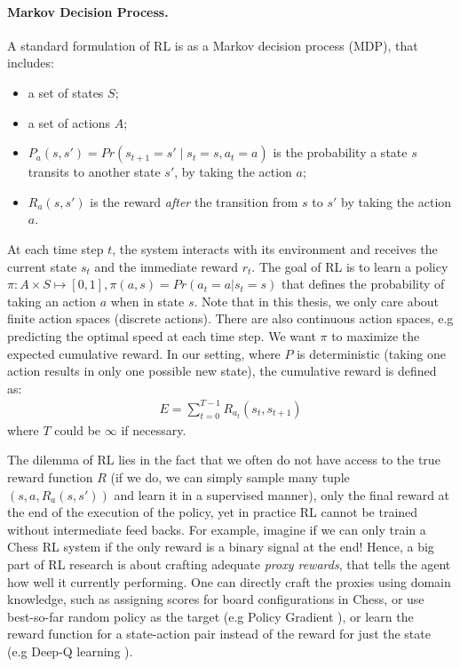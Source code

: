 \paragraph{Markov Decision Process.} A standard formulation of RL is as a
Markov decision process (MDP), that includes:
\begin{itemize}
  \item a set of states $S$;
  \item a set of actions $A$;
  \item $P_a(s, s') = Pr(s_{t+1} = s' \mid s_t = s, a_t = a)$ is the probability
    a state $s$ transits to another state $s'$, by taking the action $a$;
  \item $R_a(s, s')$ is the reward \emph{after} the transition from $s$ to $s'$ by
    taking the action $a$.  
\end{itemize}
At each time step $t$, the system interacts with its environment and receives
the current state $s_t$ and the immediate reward $r_t$. The goal of RL is to
learn a policy $\pi: A \times S \mapsto [0, 1], \pi(a, s) = Pr(a_t=a|s_t=s)$
that defines the probability of taking an action $a$ when in state $s$. Note
that in this thesis, we only care about finite action spaces (discrete actions).
There are also continuous action spaces, e.g predicting the
optimal speed at each time step. We want $\pi$ to maximize the expected
cumulative reward. In our setting, where $P$ is deterministic (taking one action
results in only one possible new state), the cumulative
reward is defined as:
\begin{align}
  E = \sum_{t=0}^{T-1}{R_{a_t}(s_t, s_{t+1})}
\end{align}
where $T$ could be $\infty$ if necessary.

The dilemma of RL lies in the fact that we often do not have access to the true
reward function $R$ (if we do, we can simply sample many tuple $(s, a,
R_a(s, s'))$ and learn it in a supervised manner), only the final reward at the
end of the execution of the policy, yet in practice RL cannot be trained without
intermediate feed backs. For example, imagine if we can only train a Chess RL system if the
only reward is a binary signal at the end! Hence, a big part of RL research is
about crafting adequate \emph{proxy rewards}, that tells the agent how well
it currently performing. One can directly craft the proxies using domain
knowledge, such as assigning scores for board configurations in Chess, or use
best-so-far random policy as the target (e.g Policy Gradient \cite{reinforce}), or learn the reward
function for a state-action pair instead of the reward for just the state
(e.g Deep-Q learning \cite{deepq}).